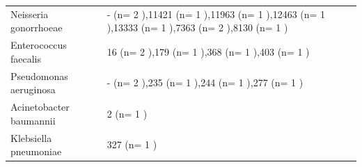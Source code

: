 \documentclass[
  a4paper,
]{article}
\begin{document}
\begin{longtable}[l]{ll}
\toprule
\cellcolor[HTML]{D4D4D4}{\textbf{Species}} & \cellcolor[HTML]{D4D4D4}{\textbf{MLST}}\\
\midrule
Neisseria gonorrhoeae & - (n= 2 ),11421 (n= 1 ),11963 (n= 1 ),12463 (n= 1 ),13333 (n= 1 ),7363 (n= 2 ),8130 (n= 1 )\\
Enterococcus faecalis & 16 (n= 2 ),179 (n= 1 ),368 (n= 1 ),403 (n= 1 )\\
Pseudomonas aeruginosa & - (n= 2 ),235 (n= 1 ),244 (n= 1 ),277 (n= 1 )\\
Acinetobacter baumannii & 2 (n= 1 )\\
Klebsiella pneumoniae & 327 (n= 1 )\\
\bottomrule
\end{longtable}

\newpage
\end{document}
